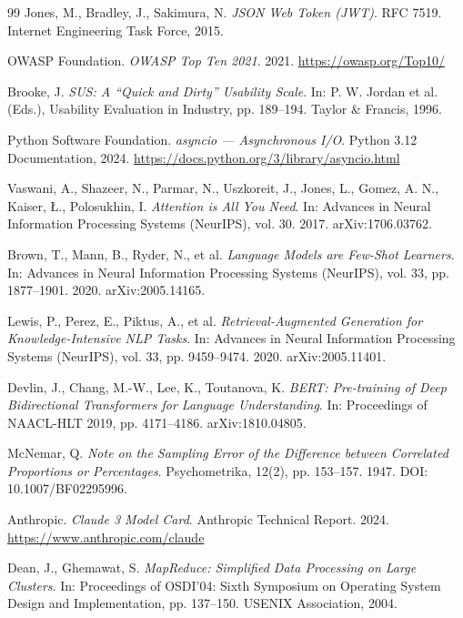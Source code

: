 \documentclass[12pt,a4paper]{report}
\begin{document}
\begin{thebibliography}{99}
Jones, M., Bradley, J., Sakimura, N.
\textit{JSON Web Token (JWT)}.
RFC 7519. Internet Engineering Task Force, 2015.

OWASP Foundation.
\textit{OWASP Top Ten 2021}.
2021.
\url{https://owasp.org/Top10/}

Brooke, J.
\textit{SUS: A ``Quick and Dirty'' Usability Scale}.
In: P. W. Jordan et al. (Eds.), Usability Evaluation in Industry, pp. 189--194.
Taylor \& Francis, 1996.

Python Software Foundation.
\textit{asyncio --- Asynchronous I/O}.
Python 3.12 Documentation, 2024.
\url{https://docs.python.org/3/library/asyncio.html}

Vaswani, A., Shazeer, N., Parmar, N., Uszkoreit, J., Jones, L., Gomez, A. N., Kaiser, Ł., Polosukhin, I.
\textit{Attention is All You Need}.
In: Advances in Neural Information Processing Systems (NeurIPS), vol. 30. 2017.
arXiv:1706.03762.

Brown, T., Mann, B., Ryder, N., et al.
\textit{Language Models are Few-Shot Learners}.
In: Advances in Neural Information Processing Systems (NeurIPS), vol. 33, pp. 1877--1901. 2020.
arXiv:2005.14165.

Lewis, P., Perez, E., Piktus, A., et al.
\textit{Retrieval-Augmented Generation for Knowledge-Intensive NLP Tasks}.
In: Advances in Neural Information Processing Systems (NeurIPS), vol. 33, pp. 9459--9474. 2020.
arXiv:2005.11401.

Devlin, J., Chang, M.-W., Lee, K., Toutanova, K.
\textit{BERT: Pre-training of Deep Bidirectional Transformers for Language Understanding}.
In: Proceedings of NAACL-HLT 2019, pp. 4171--4186.
arXiv:1810.04805.

McNemar, Q.
\textit{Note on the Sampling Error of the Difference between Correlated Proportions or Percentages}.
Psychometrika, 12(2), pp. 153--157. 1947.
DOI: 10.1007/BF02295996.

Anthropic.
\textit{Claude 3 Model Card}.
Anthropic Technical Report. 2024.
\url{https://www.anthropic.com/claude}

Dean, J., Ghemawat, S.
\textit{MapReduce: Simplified Data Processing on Large Clusters}.
In: Proceedings of OSDI'04: Sixth Symposium on Operating System Design and Implementation, pp. 137--150.
USENIX Association, 2004.

\end{thebibliography}
\end{document}
